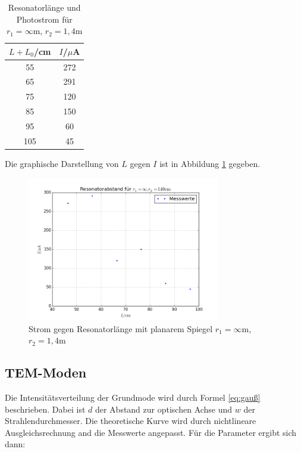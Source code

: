 \begin{table}[H]
	\begin{center}
		\begin{tabular}{c c}
			\toprule
			\(L+L_0\)/cm & \(I\)/\(\mu\)A \\
			\midrule
			55              &272\\                                                                           
			65              &291\\                                                                             
			75              &120\\                                                                               
			85              &150\\                                                                                 
			95              &60\\                                                                                  
			105             &45\\
			\bottomrule
		\end{tabular}
		\caption{Resonatorlänge und Photostrom für \(r_1=\infty\)m, \(r_2=1,4\)m}
		\label{tab:t2}
	\end{center}
\end{table}

\noindent Die graphische Darstellung von \(L\) gegen \(I\) ist in Abbildung \ref{fig:stabil2} gegeben.

\begin{figure}
	\centering
		\includegraphics[width=0.75\textwidth]{plots/stabil2}
	\caption{Strom gegen Resonatorlänge mit planarem Spiegel \(r_1=\infty\)m, \(r_2=1,4\)m}
	\label{fig:stabil2}
\end{figure}

\subsection{TEM-Moden}
Die Intensitätsverteilung der Grundmode wird durch Formel \ref{eq:gauß} beschrieben. Dabei ist \(d\) der Abstand zur optischen Achse und \(w\) der Strahlendurchmesser. Die theoretische Kurve wird durch nichtlineare Ausgleichsrechnung and die Messwerte angepasst. Für die Parameter ergibt sich dann:


